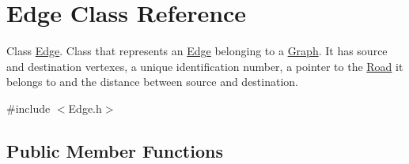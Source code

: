\hypertarget{class_edge}{}\section{Edge Class Reference}
\label{class_edge}


Class \hyperlink{class_edge}{Edge}. Class that represents an \hyperlink{class_edge}{Edge} belonging to a \hyperlink{class_graph}{Graph}. It has source and destination vertexes, a unique identification number, a pointer to the \hyperlink{class_road}{Road} it belongs to and the distance between source and destination.  




{\ttfamily \#include $<$Edge.\+h$>$}

\subsection*{Public Member Functions}
